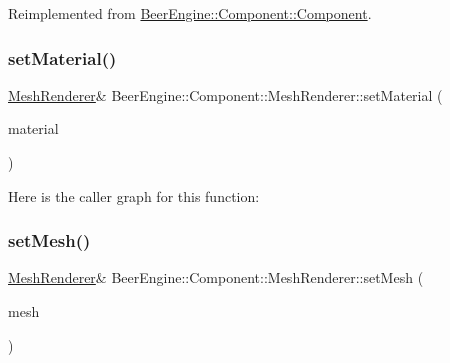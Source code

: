 Reimplemented from \mbox{\hyperlink{class_beer_engine_1_1_component_1_1_component_a4d82d8a6b22b93514e0585fa4073041f}{Beer\+Engine\+::\+Component\+::\+Component}}.

\mbox{\label{class_beer_engine_1_1_component_1_1_mesh_renderer_a9d4408a8c5e670c130394c59eeb5ccf2}} 
\subsubsection{\texorpdfstring{set\+Material()}{setMaterial()}}
{\footnotesize\ttfamily \mbox{\hyperlink{class_beer_engine_1_1_component_1_1_mesh_renderer}{Mesh\+Renderer}}\& Beer\+Engine\+::\+Component\+::\+Mesh\+Renderer\+::set\+Material (\begin{DoxyParamCaption}\item[{\mbox{\hyperlink{class_beer_engine_1_1_graphics_1_1_a_material}{Graphics\+::\+A\+Material}} $\ast$}]{material }\end{DoxyParamCaption})}

Here is the caller graph for this function\+:
\mbox{\label{class_beer_engine_1_1_component_1_1_mesh_renderer_a818276a7fe8703a04bf431a41fa4c907}} 
\subsubsection{\texorpdfstring{set\+Mesh()}{setMesh()}\hspace{0.1cm}{\footnotesize\ttfamily [1/2]}}
{\footnotesize\ttfamily \mbox{\hyperlink{class_beer_engine_1_1_component_1_1_mesh_renderer}{Mesh\+Renderer}}\& Beer\+Engine\+::\+Component\+::\+Mesh\+Renderer\+::set\+Mesh (\begin{DoxyParamCaption}\item[{\mbox{\hyperlink{class_beer_engine_1_1_graphics_1_1_mesh}{Graphics\+::\+Mesh}} $\ast$}]{mesh }\end{DoxyParamCaption})}

